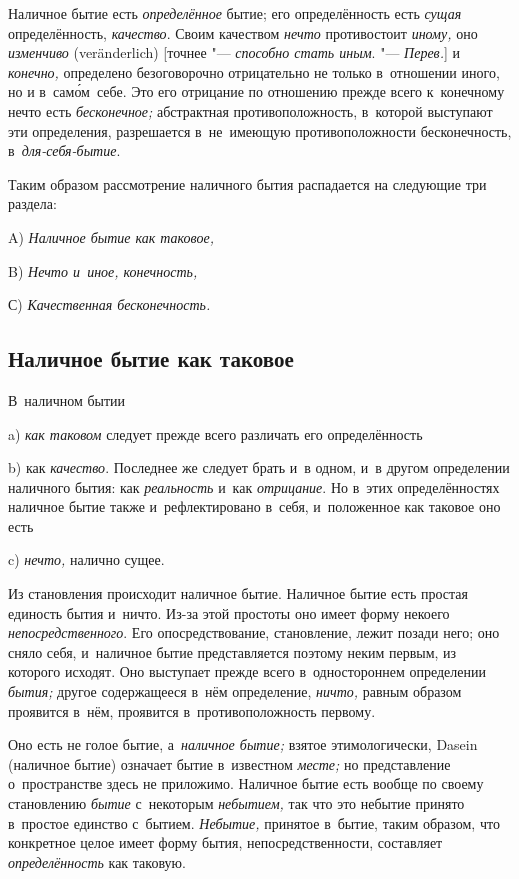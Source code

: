 Наличное бытие есть {\em определённое} бытие; его определённость есть
{\em сущая} определённость, {\em качество}. Своим качеством {\em нечто}
противостоит {\em иному,} оно {\em изменчиво} (ver\-änder\-lich)
[точнее "--- {\em способно стать иным}. "--- {\em Перев.}] и {\em конечно,}
определено безоговорочно отрицательно не только в~отношении иного, но и
в~сам\'{о}м~себе. Это его отрицание по отношению прежде всего к~конечному нечто
есть {\em бесконечное;} абстрактная противоположность, в~которой выступают эти
определения, разрешается в~не~имеющую противоположности бесконечность,
в~{\em для-себя-бытие}.

Таким образом рассмотрение наличного бытия
распадается на следующие три раздела:

A) {\em Наличное бытие как таковое,}

B) {\em Нечто и~иное, конечность,}

С) {\em Качественная бесконечность.}

\subsection{Наличное бытие как таковое}

В~наличном бытии

a) {\em как таковом} следует прежде всего различать его определённость

b) как {\em качество}. Последнее же следует брать и~в одном, и~в другом
определении наличного бытия: как {\em реальность} и~как {\em отрицание}.
Но в~этих определённостях наличное бытие также и~рефлектировано в~себя,
и~положенное как таковое оно есть

c) {\em нечто,} налично сущее.


Из становления происходит наличное бытие. Наличное бытие есть простая единость
бытия и~ничто. Из-за этой простоты оно имеет форму некоего
{\em непосредственного}. Его опосредствование, становление, лежит позади него;
оно сняло себя, и~наличное бытие представляется поэтому неким первым, из
которого исходят. Оно выступает прежде всего в~одностороннем определении
{\em бытия;} другое содержащееся в~нём определение, {\em ничто,} равным
образом проявится в~нём, проявится в~противоположность первому.

Оно есть не голое бытие, а~{\em наличное бытие;} взятое этимологически, Dasein
(наличное бытие) означает бытие в~известном {\em месте;} но представление
о~пространстве здесь не приложимо. Наличное бытие есть вообще по своему
становлению {\em бытие} с~некоторым {\em небытием,} так что это небытие принято
в~простое единство с~бытием. {\em Небытие,} принятое в~бытие, таким образом,
что конкретное целое имеет форму бытия, непосредственности, составляет
{\em определённость} как таковую.

